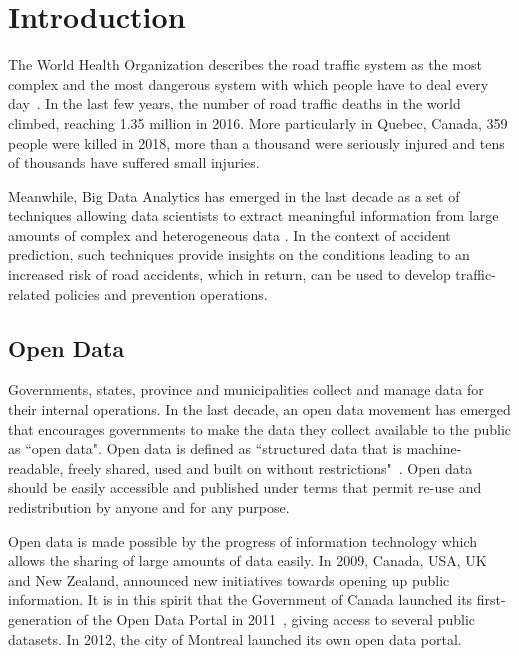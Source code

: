 \documentclass[conference]{IEEEtran}
\begin{document}

\section{Introduction}

The World Health Organization describes the road traffic system as the most
complex and the most dangerous system with which people have to deal every
day~\cite{Peden2004}. In the last few years, the number of road traffic deaths in the world climbed, reaching 1.35 million in 2016\cite{road_safety_report}. More particularly in Quebec, Canada, 359 people were killed in 2018, more than a thousand were seriously injured and tens of thousands have suffered small injuries\cite{saaq}.

Meanwhile, Big Data Analytics has emerged in the last decade as a set of techniques allowing data scientists to extract meaningful information from large amounts of complex and heterogeneous data \cite{Gandomi2015}. In the context of accident prediction, such techniques provide insights on the conditions leading to an increased risk of road accidents, which in return, can be used to develop traffic-related policies and prevention operations. 


\subsection{Open Data}

Governments, states, province and municipalities collect and manage data for their internal operations. In the last decade, an open data movement has emerged that encourages governments to make the data they collect available to the public as ``open data".
Open data is defined as ``structured data that is machine-readable, freely shared, used and built on without restrictions"~\cite{opendata101}. Open data should be easily accessible and published under terms that permit re-use and redistribution by anyone and for any purpose.

Open data is made possible by the progress of information technology which allows the sharing of large amounts of data easily. In 2009, Canada, USA, UK and New Zealand, announced new initiatives towards opening up public information. It is in this spirit that the Government of Canada launched its first-generation of the Open Data Portal in 2011~\cite{opendata101}, giving access to several public datasets. In 2012, the city of Montreal launched its own open data portal.
\end{document}
